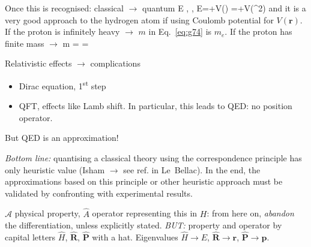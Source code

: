 \documentclass[12pt]{article}
\begin{document}
Once this is recognised: classical $\to$ quantum
\be
E \rightarrow {},\quad {} \rightarrow {},\quad {} \rightarrow {}
\ee
\be
E=+V\left(\right) 
\rightarrow 
{}=+V\left(^{2}\right)
\label{eq:g74}
\ee
and it is a very good approach to the hydrogen atom
if using Coulomb potential
for $V(\mathbf{r})$.
If the proton is infinitely heavy $\to$ $m$ in Eq.~\eqref{eq:g74} is $m_e$.
If the proton has finite mass $\to$
\be
m = =\mu
\ee 


Relativistic effects $\to$ complications
\begin{itemize}
\item Dirac equation, 1\textsuperscript{st} step
\item QFT, effects like Lamb shift. In particular, this leads to 
QED: no position operator.
\end{itemize}
But QED is an approximation!

\emph{Bottom line:} quantising a classical theory
using the correspondence principle has
only heuristic value (Isham $\to$ see ref. in Le~Bellac).
In the end, the approximations based 
on this principle or other heuristic
approach must be validated by confronting
with experimental results.

$\mathcal{A}$ physical property, $\hat{A}$ operator representing
this in $H$: from here on, \emph{abandon} the
differentiation, unless explicitly stated.
\emph{BUT:} property and operator by capital 
letters $\hat{H}$, $\hat{\mathbf{R}}$, $\hat{\mathbf{P}}$ with a hat.
Eigenvalues $\hat{H} \to E$, $\hat{\mathbf{R}} \to \mathbf{r}$, $\hat{\mathbf{P}} \to \mathbf{p}$.
\end{document}
